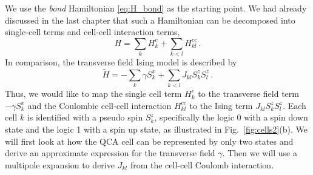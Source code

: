 We use the \emph{bond} Hamiltonian \eqref{eq:H_bond} as the starting point. We
had already discussed in the last chapter that such a Hamiltonian can be
decomposed into single-cell terms and cell-cell interaction terms,
\begin{equation}
  H = \sum_k H^c_k + \sum_{k<l} H^{cc}_{kl} \, .
\end{equation}
In comparison, the transverse field Ising model is described by
%
\begin{equation}
  \tilde{H} = - \sum_k \gamma S^x_k + \sum_{k<l} J_{kl} S^z_k S^z_l \, .
\end{equation}
%
Thus, we would like to map the single cell term $H^c_k$ to the transverse field
term $-\gamma S^x_k$ and the Coulombic cell-cell interaction $H^{cc}_{kl}$ to 
the Ising term $J_{kl} S^z_k S^z_l$. Each cell $k$ is identified with a pseudo
spin $S^z_k$, specifically the logic 0 with a spin down state and the logic 1
with a spin up state, as illustrated in Fig.~\ref{fig:cells2}(b). We will first
look at how the QCA cell can be represented by only two states and derive an
approximate expression for the transverse field $\gamma$. Then we will use a
multipole expansion to derive $J_{kl}$ from the cell-cell Coulomb interaction.

